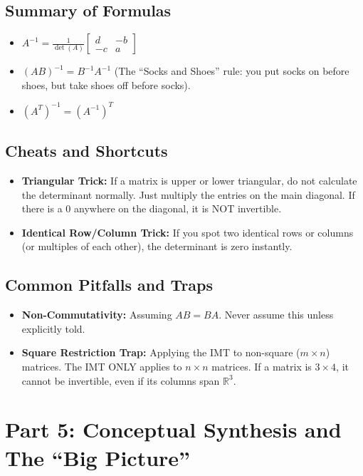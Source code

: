 \documentclass[11pt]{article}
\begin{document}
\subsection*{Summary of Formulas}
\begin{itemize}
    \item $A^{-1} = \frac{1}{\det(A)} \begin{bmatrix} d & -b \\ -c & a \end{bmatrix}$
    \item $(AB)^{-1} = B^{-1} A^{-1}$ (The ``Socks and Shoes'' rule: you put socks on before shoes, but take shoes off before socks).
    \item $(A^T)^{-1} = (A^{-1})^T$
\end{itemize}

\subsection*{Cheats and Shortcuts}
\begin{itemize}
    \item \textbf{Triangular Trick:} If a matrix is upper or lower triangular, do not calculate the determinant normally. Just multiply the entries on the main diagonal. If there is a $0$ anywhere on the diagonal, it is NOT invertible.
    \item \textbf{Identical Row/Column Trick:} If you spot two identical rows or columns (or multiples of each other), the determinant is zero instantly.
\end{itemize}

\subsection*{Common Pitfalls and Traps}
\begin{itemize}
    \item \textbf{Non-Commutativity:} Assuming $AB = BA$. Never assume this unless explicitly told.
    \item \textbf{Square Restriction Trap:} Applying the IMT to non-square ($m \times n$) matrices. The IMT ONLY applies to $n \times n$ matrices. If a matrix is $3 \times 4$, it cannot be invertible, even if its columns span $\mathbb{R}^3$.
\end{itemize}

\section*{Part 5: Conceptual Synthesis and The ``Big Picture''}
\end{document}
